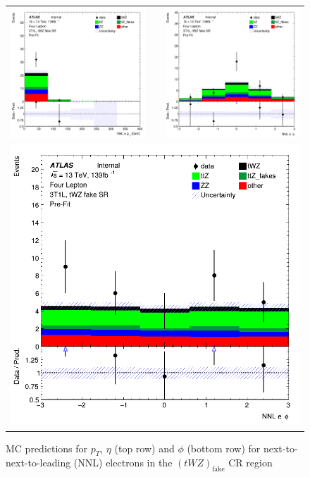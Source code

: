 \begin{figure}[htbp]
\centering
  \begin{tabular}{ccc}

    \includegraphics[width=.2\textwidth]{figures/PreFitPlots/lep4_tWZ_3T1L_NNL_el_pt} & &
    \includegraphics[width=.2\textwidth]{figures/PreFitPlots/lep4_tWZ_3T1L_NNL_el_eta} \\
    \multicolumn{3}{c}{\includegraphics[width=.2\textwidth]{figures/PreFitPlots/lep4_tWZ_3T1L_NNL_el_phi}}
  \end{tabular}
    \caption{MC predictions for $p_{T}$, $\eta$ (top row) and $\phi$ (bottom row) for next-to-next-to-leading (NNL) electrons in the $(tWZ)_{\text{fake}}$ CR region}
  \label{fig:4lep-3T1L-CR-electronPlots}
\end{figure}
\clearpage

